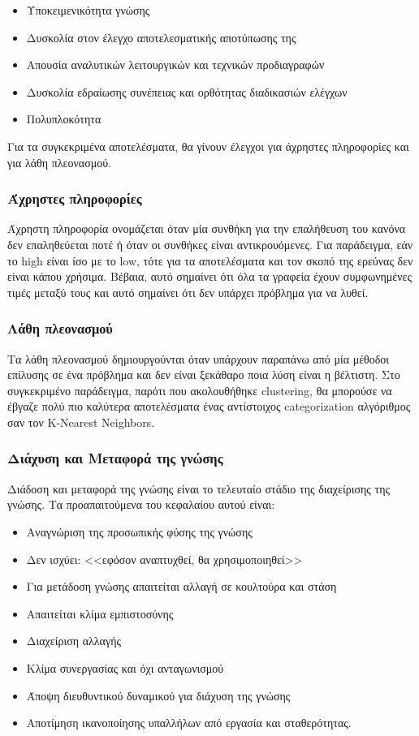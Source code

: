 \begin{itemize}
  \item Υποκειμενικότητα γνώσης
  \item Δυσκολία στον έλεγχο αποτελεσματικής αποτύπωσης της
  \item Απουσία αναλυτικών λειτουργικών και τεχνικών προδιαγραφών
  \item Δυσκολία εδραίωσης συνέπειας και ορθότητας διαδικασιών ελέγχων
  \item Πολυπλοκότητα
\end{itemize}

Για τα συγκεκριμένα αποτελέσματα, θα γίνουν έλεγχοι για άχρηστες πληροφορίες και για λάθη πλεονασμού.

\subsubsection*{Άχρηστες πληροφορίες}

Άχρηστη πληροφορία ονομάζεται όταν μία συνθήκη για την επαλήθευση του κανόνα δεν επαληθεύεται ποτέ ή όταν οι συνθήκες είναι αντικρουόμενες. Για παράδειγμα, εάν το high είναι ίσο με το low, τότε για τα αποτελέσματα και τον σκοπό της ερεύνας δεν είναι κάπου χρήσιμα. Βέβαια, αυτό σημαίνει ότι όλα τα γραφεία έχουν συμφωνημένες τιμές μεταξύ τους και αυτό σημαίνει ότι δεν υπάρχει πρόβλημα για να λυθεί.

\subsubsection*{Λάθη πλεονασμού}

Τα λάθη πλεονασμού δημιουργούνται όταν υπάρχουν παραπάνω από μία μέθοδοι επίλυσης σε ένα πρόβλημα και δεν είναι ξεκάθαρο ποια λύση είναι η βέλτιστη. Στο συγκεκριμένο παράδειγμα, παρότι που ακολουθήθηκε clustering, θα μπορούσε να έβγαζε πολύ πιο καλύτερα αποτελέσματα ένας αντίστοιχος categorization αλγόριθμος σαν τον K-Nearest Neighbors.

\subsubsection{Διάχυση και Μεταφορά της γνώσης}

Διάδοση και μεταφορά της γνώσης είναι το τελευταίο στάδιο της διαχείρισης της γνώσης. Τα προαπαιτούμενα του κεφαλαίου αυτού είναι:

\begin{itemize}
  \item Αναγνώριση της προσωπικής φύσης της γνώσης
  \item Δεν ισχύει: <<εφόσον αναπτυχθεί, θα χρησιμοποιηθεί>>
  \item Για μετάδοση γνώσης απαιτείται αλλαγή σε κουλτούρα και στάση
  \item Απαιτείται κλίμα εμπιστοσύνης
  \item Διαχείριση αλλαγής
  \item Κλίμα συνεργασίας και όχι ανταγωνισμού
  \item Άποψη διευθυντικού δυναμικού για διάχυση της γνώσης
  \item Αποτίμηση ικανοποίησης υπαλλήλων από εργασία και σταθερότητας.
\end{itemize}

